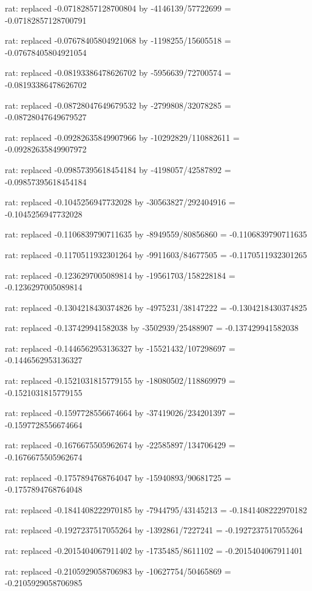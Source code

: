 \documentclass[a4paper,10pt]{article}
\begin{document}
\begin{eulernotebook}
\begin{eulercomment}
\begin{eulercomment}
\begin{eulercomment}
\begin{eulercomment}
\begin{eulercomment}
\begin{eulercomment}
\begin{eulercomment}
\begin{eulercomment}
\begin{eulercomment}
\begin{eulercomment}
\begin{eulercomment}
\begin{eulercomment}
\begin{eulercomment}
\begin{eulercomment}
\begin{eulercomment}
\begin{eulercomment}
\begin{euleroutput}
  rat: replaced -0.07182857128700804 by -4146139/57722699 = -0.07182857128700791
  
  rat: replaced -0.07678405804921068 by -1198255/15605518 = -0.07678405804921054
  
  rat: replaced -0.08193386478626702 by -5956639/72700574 = -0.08193386478626702
  
  rat: replaced -0.08728047649679532 by -2799808/32078285 = -0.08728047649679527
  
  rat: replaced -0.09282635849907966 by -10292829/110882611 = -0.09282635849907972
  
  rat: replaced -0.09857395618454184 by -4198057/42587892 = -0.09857395618454184
  
  rat: replaced -0.1045256947732028 by -30563827/292404916 = -0.1045256947732028
  
  rat: replaced -0.1106839790711635 by -8949559/80856860 = -0.1106839790711635
  
  rat: replaced -0.1170511932301264 by -9911603/84677505 = -0.1170511932301265
  
  rat: replaced -0.1236297005089814 by -19561703/158228184 = -0.1236297005089814
  
  rat: replaced -0.1304218430374826 by -4975231/38147222 = -0.1304218430374825
  
  rat: replaced -0.137429941582038 by -3502939/25488907 = -0.137429941582038
  
  rat: replaced -0.1446562953136327 by -15521432/107298697 = -0.1446562953136327
  
  rat: replaced -0.1521031815779155 by -18080502/118869979 = -0.1521031815779155
  
  rat: replaced -0.1597728556674664 by -37419026/234201397 = -0.1597728556674664
  
  rat: replaced -0.1676675505962674 by -22585897/134706429 = -0.1676675505962674
  
  rat: replaced -0.1757894768764047 by -15940893/90681725 = -0.1757894768764048
  
  rat: replaced -0.1841408222970185 by -7944795/43145213 = -0.1841408222970182
  
  rat: replaced -0.1927237517055264 by -1392861/7227241 = -0.1927237517055264
  
  rat: replaced -0.2015404067911402 by -1735485/8611102 = -0.2015404067911401
  
  rat: replaced -0.2105929058706983 by -10627754/50465869 = -0.2105929058706985
  

\end{euleroutput}
\end{eulercomment}
\end{eulercomment}
\end{eulercomment}
\end{eulercomment}
\end{eulercomment}
\end{eulercomment}
\end{eulercomment}
\end{eulercomment}
\end{eulercomment}
\end{eulercomment}
\end{eulercomment}
\end{eulercomment}
\end{eulercomment}
\end{eulercomment}
\end{eulercomment}
\end{eulercomment}
\end{eulernotebook}
\end{document}
